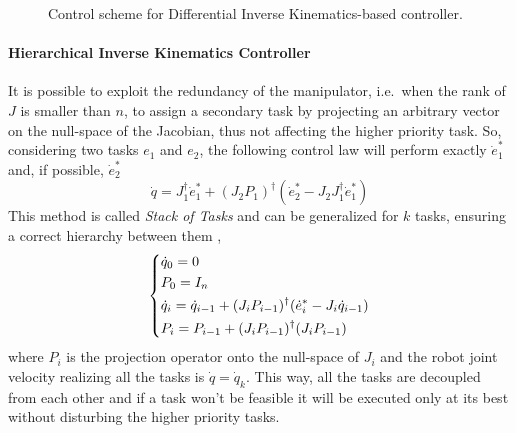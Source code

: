 \begin{figure}[h]
\centering
{}

\caption{Control scheme for Differential Inverse Kinematics-based controller.}
\label{fig:diffinversekinematics}
\end{figure}

\paragraph{Hierarchical Inverse Kinematics Controller}
It is possible to exploit the redundancy of the manipulator, i.e.\ when the rank of $J$ is smaller than $n$, to assign a secondary task by projecting an arbitrary vector on the null-space of the Jacobian, thus not affecting the higher priority task. So, considering two tasks $e_1$ and $e_2$, the following control law will perform exactly $\dot{e}_1^*$ and, if possible, $\dot{e}_2^*$
\begin{equation}
\dot{q} = J_1^{\dagger}\dot{e}_1^* + (J_{2}P_1)^{\dagger}(\dot{e}_2^* - J_{2}J_1^{\dagger}\dot{e}_1^*)
\end{equation}
This method is called \textit{Stack of Tasks} and can be generalized for $k$ tasks, ensuring a correct hierarchy between them \cite{mansardICAR09},\cite{mansardIEEE09}
\begin{equation}
\begin{dcases}
\dot{q}_0 = 0\\
P_0 = I_n\\
\dot{q}_i = \dot{q}_{i-1} + (J_{i}P_{i-1})^{\dagger}(\dot{e}_i^* - J_{i}\dot{q}_{i-1})\\
P_i = P_{i-1} + (J_{i}P_{i-1})^{\dagger}(J_{i}P_{i-1})
\end{dcases}
\end{equation}
where $P_i$ is the projection operator onto the null-space of $J_i$ and the robot joint velocity realizing all the tasks is $\dot{q}=\dot{q}_k$. This way, all the tasks are decoupled from each other and if a task won't be feasible it will be executed only at its best without disturbing the higher priority tasks.

